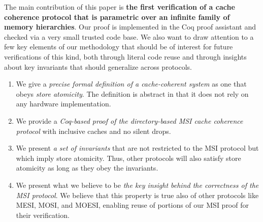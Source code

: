 The main contribution of this paper is \textbf{the first verification of a
cache coherence protocol that is parametric over an infinite family of
memory hierarchies}.  Our proof is implemented in the Coq proof assistant and
checked via a very small trusted code base.  We also want to draw attention to
a few key elements of our methodology that should be of interest for future
verifications of this kind, both through literal code reuse and through insights
about key invariants that should generalize across protocols.
\begin{enumerate}

\item We give a \emph{precise formal definition of a cache-coherent system} as one
that obeys \emph{store atomicity}. The definition is abstract in that it does not
rely on any hardware implementation.
\item We provide a \emph{Coq-based proof of the directory-based MSI cache coherence
protocol} with inclusive caches and no silent drops.
\item We present \emph{a set of invariants} that are not restricted to the MSI
protocol but which imply store atomicity. Thus, other protocols will also
satisfy store atomicity as long as they obey the invariants.
\item We present what we believe to be \emph{the key insight behind the
correctness of the MSI protocol}. We believe that this property is true also of
other protocols like MESI, MOSI, and MOESI, enabling reuse of portions of our
MSI proof for their verification.

\end{enumerate}


%

